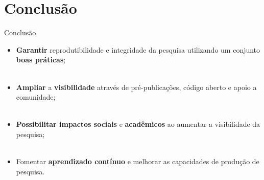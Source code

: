 \section{Conclusão}
\label{s.conclusion}

\begin{frame}{Conclusão}
	\justify 
	\begin{itemize}
		\item<1> \textbf{Garantir} reprodutibilidade e integridade da pesquisa utilizando um conjunto \textbf{boas práticas};
		\\~\\
		\item<2> \textbf{Ampliar} a \textbf{visibilidade} através de pré-publicações, código aberto e apoio a comunidade;
		\\~\\
		\item<3> \textbf{Possibilitar impactos sociais} e \textbf{acadêmicos} ao aumentar a visibilidade da pesquisa;
		\\~\\
		\item<4> Fomentar \textbf{aprendizado contínuo} e melhorar as capacidades de produção de pesquisa.
	\end{itemize}
\end{frame}